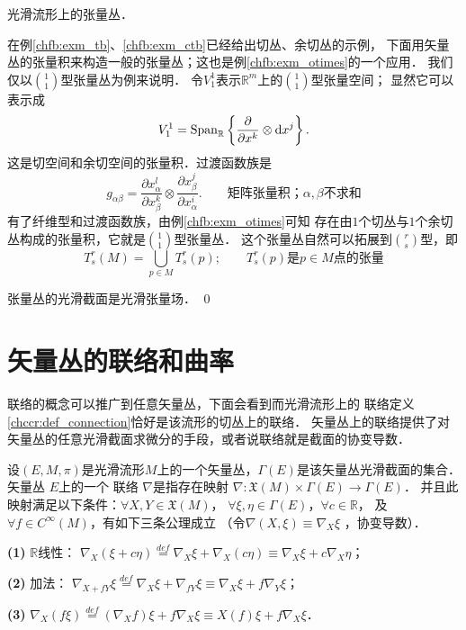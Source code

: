 \begin{example}\label{chfb:exm_tensor-bundles}
    光滑流形上的张量丛．
\end{example}
在例\ref{chfb:exm_tb}、\ref{chfb:exm_ctb}已经给出切丛、余切丛的示例，
下面用矢量丛的张量积来构造一般的张量丛；这也是例\ref{chfb:exm_otimes}的一个应用．
我们仅以$\binom{1}{1}$型张量丛为例来说明．
令$V^1_1$表示$\mathbb{R}^m$上的$\binom{1}{1}$型张量空间；
显然它可以表示成
\begin{equation*}
    V^1_1 = {\rm Span}_{\mathbb{R}}\left\{  \frac{\partial}{\partial x^k}\otimes {\rm d}x^j \right\} .
\end{equation*}
这是切空间和余切空间的张量积．过渡函数族是
\begin{equation*}
    g_{\alpha\beta} = \frac{\partial {x}^l_\alpha}{\partial {x}^k_\beta} \otimes
    \frac{\partial {x}^j_\beta}{\partial {x}^i_\alpha}  .
    \qquad \text{矩阵张量积；}\alpha,\beta \text{不求和}
\end{equation*}
有了纤维型和过渡函数族，由例\ref{chfb:exm_otimes}可知
存在由$1$个切丛与$1$个余切丛构成的张量积，它就是$\binom{1}{1}$型张量丛．
这个张量丛自然可以拓展到$\binom{r}{s}$型，即
\begin{equation*}
    T_s^r(M)=\bigcup_{p \in M} T_s^r(p); \qquad
    T_s^r(p)\text{是}p\in M\text{点的张量}
\end{equation*}


张量丛的光滑截面是光滑张量场．
\qed








\section{矢量丛的联络和曲率}\label{chfb:sec_connection}

联络的概念可以推广到任意矢量丛，下面会看到而光滑流形上的
联络定义\ref{chccr:def_connection}恰好是该流形的切丛上的联络．
矢量丛上的联络提供了对矢量丛的任意光滑截面求微分的手段，或者说联络就是截面的协变导数．


\begin{definition}\label{chfb:def_vb-conncection}
    设$(E,M,\pi)$是光滑流形$M$上的一个矢量丛，$\Gamma(E)$是该矢量丛光滑截面的集合．
    矢量丛 $E$上的一个 {\heiti 联络} $\nabla$是指存在映射
    $\nabla: \mathfrak{X}(M) \times \Gamma(E) \rightarrow \Gamma(E)$．
    并且此映射满足以下条件：$\forall X, Y \in \mathfrak{X}(M)$，
    $\forall \xi, \eta \in \Gamma(E)$，$\forall c \in \mathbb{R}$，
    及 $\forall f \in C^{\infty}(M)$，有如下三条公理成立
    （令$\nabla(X, \xi)\equiv \nabla_X \xi$ ，{\heiti 协变导数}）．
    
    {\bfseries (1)} $\mathbb{R}$线性： $\nabla_X(\xi+c \eta) \overset{def}{=}
     \nabla_X \xi+\nabla_X (c\eta) \equiv  \nabla_X \xi+c \nabla_X \eta$；
    
    {\bfseries (2)} 加法： $\nabla_{X+f Y} \xi \overset{def}{=} 
    \nabla_X \xi+ \nabla_{fY} \xi \equiv \nabla_X \xi+f \nabla_Y \xi$；
    
    {\bfseries (3)} $\nabla_X(f \xi) \overset{def}{=} (\nabla_X f) \xi+f \nabla_X \xi
     \equiv X(f) \xi+f \nabla_X \xi$．
\end{definition}


